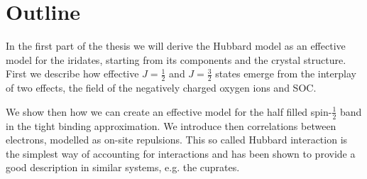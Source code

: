






\section{Outline}
In the first part of the thesis we will derive the Hubbard model as an effective model for the iridates, starting from its components and the crystal structure. 
First we describe how effective $J= \frac12$ and $J=\frac32$ states emerge from the interplay of two 
effects, the field of the negatively charged oxygen ions and SOC. 


We show then how we can create an effective model for the half filled spin-$\frac12$ band in the tight binding approximation. 
We introduce then  correlations between electrons, modelled as on-site repulsions. 
This so called Hubbard interaction is the simplest way of accounting for interactions 
and has been shown to provide a good description in similar systems, e.g. the cuprates.

